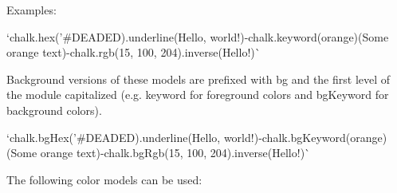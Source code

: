 Examples\+:


\begin{DoxyItemize}
\item `chalk.\+hex('\#\+D\+E\+A\+D\+ED\textquotesingle{}).underline(\textquotesingle{}Hello, world!\textquotesingle{}){\ttfamily  -\/}chalk.\+keyword(\textquotesingle{}orange\textquotesingle{})(\textquotesingle{}Some orange text\textquotesingle{}){\ttfamily  -\/}chalk.\+rgb(15, 100, 204).inverse(\textquotesingle{}Hello!\textquotesingle{})\`{}
\end{DoxyItemize}

Background versions of these models are prefixed with {\ttfamily bg} and the first level of the module capitalized (e.\+g. {\ttfamily keyword} for foreground colors and {\ttfamily bg\+Keyword} for background colors).


\begin{DoxyItemize}
\item `chalk.\+bg\+Hex('\#\+D\+E\+A\+D\+ED\textquotesingle{}).underline(\textquotesingle{}Hello, world!\textquotesingle{}){\ttfamily  -\/}chalk.\+bg\+Keyword(\textquotesingle{}orange\textquotesingle{})(\textquotesingle{}Some orange text\textquotesingle{}){\ttfamily  -\/}chalk.\+bg\+Rgb(15, 100, 204).inverse(\textquotesingle{}Hello!\textquotesingle{})\`{}
\end{DoxyItemize}

The following color models can be used\+:


